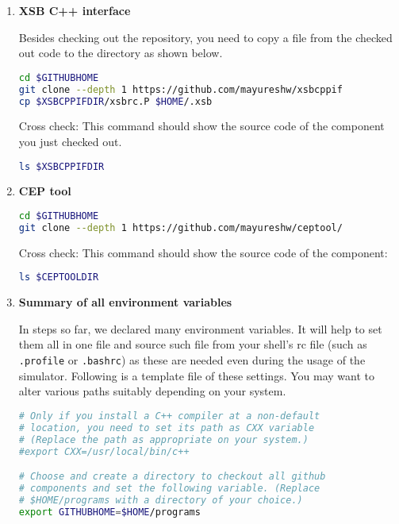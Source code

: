 \documentclass[12pt,a4paper]{article}
\begin{document}
\begin{enumerate}
\item \textbf{XSB C++ interface}

\verifonly

Besides checking out the repository, you need to copy a file from the checked out code to the directory as shown below.

\begin{lstlisting}[language=bash,style=snippet]
cd $GITHUBHOME
git clone --depth 1 https://github.com/mayureshw/xsbcppif
cp $XSBCPPIFDIR/xsbrc.P $HOME/.xsb
\end{lstlisting}

Cross check: This command should show the source code of the component you just checked out.

\begin{lstlisting}[language=bash,style=snippet]
ls $XSBCPPIFDIR
\end{lstlisting}

\item \textbf{CEP tool}

\verifonly

\begin{lstlisting}[language=bash,style=snippet]
cd $GITHUBHOME
git clone --depth 1 https://github.com/mayureshw/ceptool/
\end{lstlisting}

Cross check: This command should show the source code of the component:

\begin{lstlisting}[language=bash,style=snippet]
ls $CEPTOOLDIR
\end{lstlisting}

\item \textbf{Summary of all environment variables}

In steps so far, we declared many environment variables. It will help to set them all in one file and source such file from your shell's rc file (such as \texttt{.profile} or \texttt{.bashrc}) as these are needed even during the usage of the simulator. Following is a template file of these settings. You may want to alter various paths suitably depending on your system.

\begin{lstlisting}[language=bash,style=snippet]
# Only if you install a C++ compiler at a non-default
# location, you need to set its path as CXX variable
# (Replace the path as appropriate on your system.)
#export CXX=/usr/local/bin/c++

# Choose and create a directory to checkout all github
# components and set the following variable. (Replace
# $HOME/programs with a directory of your choice.)
export GITHUBHOME=$HOME/programs


\end{lstlisting}
\end{enumerate}
\end{document}

